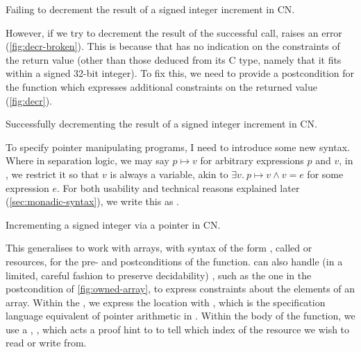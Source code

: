 \begin{marginfigure}
    \centering
    \caption{Failing to decrement the result of a signed integer increment in
        CN.}\label{fig:decr-broken}
\end{marginfigure}

However, if we try to decrement the result of the successful call, 
raises an error (\cref{fig:decr-broken}). This is because that  has no
indication on the constraints of the return value (other than those deduced
from its C type, namely that it fits within a signed 32-bit integer). To fix
this, we need to provide a postcondition for the function which
expresses additional constraints on the returned value (\cref{fig:decr}).

\begin{marginfigure}
    \centering
    \caption{Successfully decrementing the result of a signed integer increment
        in CN.}\label{fig:decr}
\end{marginfigure}

To specify pointer manipulating programs, I need to introduce some new syntax.
Where in separation logic, we may say $p \mapsto v$ for arbitrary expressions
$p$ and $v$, in , we restrict it so that $v$ is always a variable, akin
to $\exists{} v.\ p \mapsto v \wedge v = e$ for some expression $e$. For both
usability and technical reasons explained later (\cref{sec:monadic-syntax}), we
write this as . %

\begin{marginfigure}
    \centering
    \caption{Incrementing a signed integer via a pointer in CN.}\label{fig:owned-incr}
\end{marginfigure}

This generalises to work with arrays, with syntax of the form
, %
called  or  resources, for the pre- and
postconditions of the function.  can also handle (in a limited, careful
fashion to preserve decidability) , such as the
one in the postcondition of \cref{fig:owned-array}, to express constraints
about the elements of an array. Within the , we express the
location with , which is the specification language %
equivalent of pointer arithmetic in . Within the body of the
function, we use a , ,
which acts a proof hint to  to tell which index of the 
resource we wish to read or write from.

